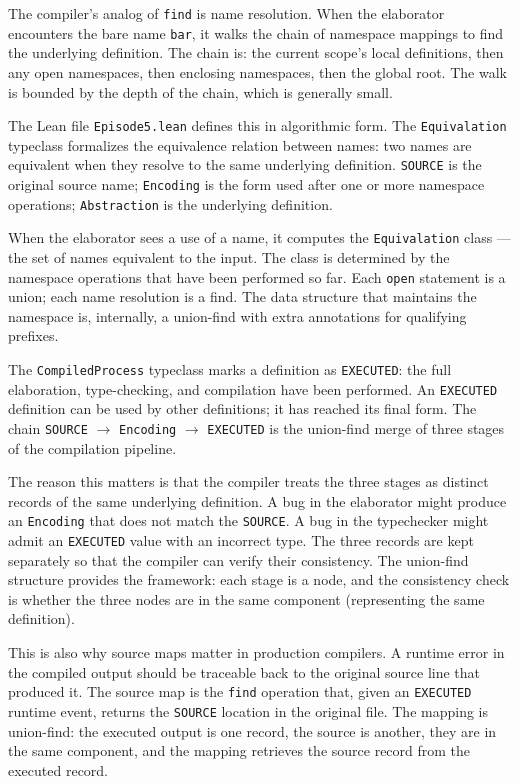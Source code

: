 The compiler's analog of \texttt{find} is name resolution. When the
elaborator encounters the bare name \texttt{bar}, it walks the chain
of namespace mappings to find the underlying definition. The chain
is: the current scope's local definitions, then any open
namespaces, then enclosing namespaces, then the global root. The
walk is bounded by the depth of the chain, which is generally small.

The Lean file \texttt{Episode5.lean} defines this in algorithmic
form. The \texttt{Equivalation} typeclass formalizes the equivalence
relation between names: two names are equivalent when they resolve
to the same underlying definition. \texttt{SOURCE} is the original
source name; \texttt{Encoding} is the form used after one or more
namespace operations; \texttt{Abstraction} is the underlying
definition.

When the elaborator sees a use of a name, it computes the
\texttt{Equivalation} class --- the set of names equivalent to the
input. The class is determined by the namespace operations that have
been performed so far. Each \texttt{open} statement is a union; each
name resolution is a find. The data structure that maintains the
namespace is, internally, a union-find with extra annotations for
qualifying prefixes.

The \texttt{CompiledProcess} typeclass marks a definition as
\texttt{EXECUTED}: the full elaboration, type-checking, and
compilation have been performed. An \texttt{EXECUTED} definition can
be used by other definitions; it has reached its final form. The
chain \texttt{SOURCE} $\to$ \texttt{Encoding} $\to$
\texttt{EXECUTED} is the union-find merge of three stages of the
compilation pipeline.

The reason this matters is that the compiler treats the three stages
as distinct records of the same underlying definition. A bug in the
elaborator might produce an \texttt{Encoding} that does not match
the \texttt{SOURCE}. A bug in the typechecker might admit an
\texttt{EXECUTED} value with an incorrect type. The three records
are kept separately so that the compiler can verify their
consistency. The union-find structure provides the framework: each
stage is a node, and the consistency check is whether the three
nodes are in the same component (representing the same definition).

This is also why source maps matter in production compilers. A
runtime error in the compiled output should be traceable back to the
original source line that produced it. The source map is the
\texttt{find} operation that, given an \texttt{EXECUTED} runtime
event, returns the \texttt{SOURCE} location in the original file. The
mapping is union-find: the executed output is one record, the source
is another, they are in the same component, and the mapping retrieves
the source record from the executed record.

